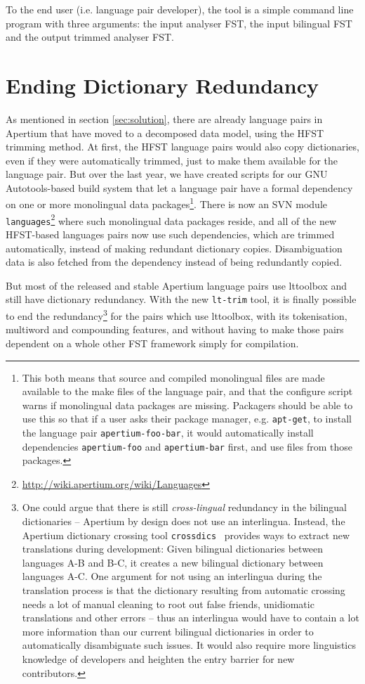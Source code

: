 \documentclass[10pt, a4paper]{article}
\newcommand{\tool}[1]{\texttt{#1}}
\begin{document}
To the end user (i.e. language pair developer), the tool is a simple
command line program with three arguments: the input analyser FST, the
input bilingual FST and the output trimmed analyser FST.

\section{Ending Dictionary Redundancy}

As mentioned in section \ref{sec:solution}, there are already language
pairs in Apertium that have moved to a decomposed data model, using
the HFST trimming method. At first, the HFST language
pairs would also copy dictionaries, even if they were automatically
trimmed, just to make them available for the language pair.  But over
the last year, we have created scripts for our GNU Autotools-based
build system that let a language pair have a formal dependency on one
or more monolingual data packages\footnote{This both means that source
    and compiled monolingual files are made available to the make
    files of the language pair, and that the configure script warns if
    monolingual data packages are missing. Packagers should be able to
    use this so 
    that if a user asks their package manager, e.g. \tool{apt-get}, to
    install the language pair \tool{apertium-foo-bar}, it would
automatically install dependencies \tool{apertium-foo} and
\tool{apertium-bar} first, and use files from those packages.}.  There
is now an SVN module
\texttt{languages}\footnote{\url{http://wiki.apertium.org/wiki/Languages}}
where such monolingual data packages reside, and all of the new
HFST-based languages pairs now use such dependencies, which are
trimmed automatically, instead of making redundant dictionary copies.
Disambiguation data is also fetched from the dependency instead of
being redundantly copied.

But most of the released and stable Apertium language pairs use
lttoolbox and still have dictionary redundancy. With the new
\tool{lt-trim} tool, it is finally possible to end the
redundancy\footnote{One could argue that there is still
  \emph{cross-lingual} redundancy in the bilingual dictionaries --
  Apertium by design does not use an interlingua. Instead, the
  Apertium dictionary crossing tool
  \tool{crossdics}~\cite{toral2011crossdics-it-ca} provides ways to
  extract new translations during development: Given bilingual
  dictionaries between languages A-B and B-C, it creates a new
  bilingual dictionary between languages A-C. One argument for not
  using an interlingua during the translation process is that the
  dictionary resulting from automatic crossing needs a lot of manual
  cleaning to root out false friends, unidiomatic translations and
  other errors -- thus an interlingua would have to contain a lot more
  information than our current bilingual dictionaries in order to
  automatically disambiguate such issues. It would also require more
  linguistics knowledge of developers and heighten the entry barrier
  for new contributors.} for the pairs which use lttoolbox, with its
tokenisation, multiword and compounding features, and without having
to make those pairs dependent on a whole other FST framework simply
for compilation.
\end{document}
